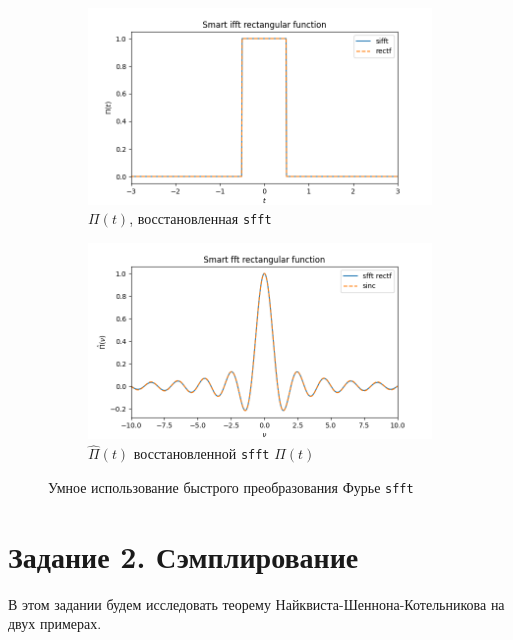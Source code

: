 \documentclass[a4paper, 12pt]{article}
\begin{document}
    \begin{figure}[H]
        \centering
        \begin{subfigure}{0.45\textwidth}
            \centering
            \includegraphics[width=\linewidth]{sifft.png}
            \caption{$\Pi(t)$, восстановленная \texttt{sfft}}
            \label{fig:sifft}
        \end{subfigure}
        \hspace{5mm}
        \begin{subfigure}{0.45\textwidth}
            \centering
            \includegraphics[width=\linewidth]{sfft.png}
            \caption{$\hat{\Pi}(t)$ восстановленной \texttt{sfft} $\Pi(t)$}
            \label{fig:sfft}
        \end{subfigure}
        \caption{Умное использование быстрого преобразования Фурье \texttt{sfft}}
        \label{fig:sffts}
    \end{figure}


    \section{Задание 2. Сэмплирование}
    В этом задании будем исследовать теорему Найквиста-Шеннона-Котельникова на двух примерах.
\end{document}
